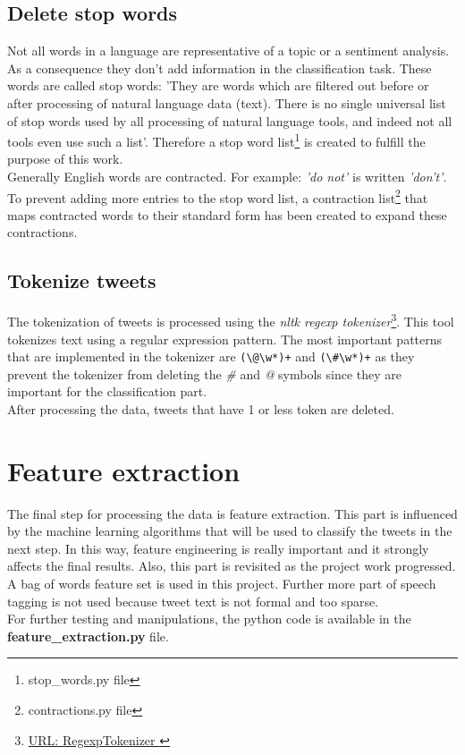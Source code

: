 \subsection{Delete stop words}
Not all words in a language are representative of a topic or a sentiment analysis. 
As a consequence they don't add information in the classification task.
These words are called stop words\cite{website:Stop_words}: 'They are words which are filtered out before or after processing of natural language data (text). There is no single universal list of stop words used by all processing of natural language tools, and indeed not all tools even use such a list'.   
Therefore a stop word list\footnote{stop\_words.py file} is created to fulfill the purpose of this work.\\
Generally English words are contracted. For example: \emph{'do not'} is written \emph{'don't'}. 
To prevent adding more entries to the stop word list, a contraction list\footnote{contractions.py file} that maps contracted words to their standard form has been created to expand these contractions.   
\subsection{Tokenize tweets }

The tokenization of tweets is processed using the \textit{nltk regexp tokenizer}\footnote{\href{http://www.nltk.org/_modules/nltk/tokenize/regexp.html}{URL: RegexpTokenizer }}.
This tool tokenizes text using a regular expression pattern.
The most important patterns that are implemented in the tokenizer are \verb/(\@\w*)+/ and \verb/(\#\w*)+/ as they prevent the tokenizer from deleting the \emph{\#} and \emph{@} symbols since they are important for the classification part.\\

After processing the data, tweets that have 1 or less token are deleted.




\section{Feature extraction}
The final step for processing the data is feature extraction. 
This part is influenced by the machine learning algorithms that will be used to classify the tweets in the next step. 
In this way, feature engineering is really important and it strongly affects the final results. 
Also, this part is revisited as the project work progressed.\\
A bag of words feature set is used in this project. Further more part of speech tagging is not used because tweet text is not formal and too sparse. \\
For further testing and manipulations, the python code is available in the \textbf{feature\_extraction.py} file.


